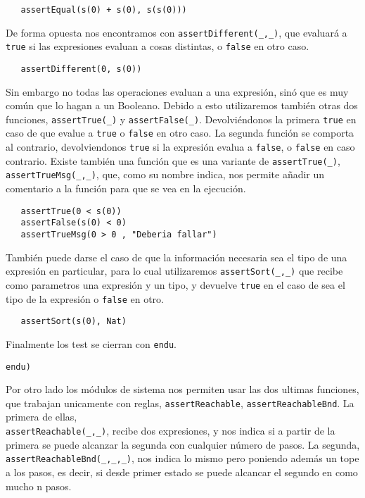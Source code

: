 {\codesize
\begin{verbatim}
   assertEqual(s(0) + s(0), s(s(0)))
\end{verbatim}
}

De forma opuesta nos encontramos con \verb"assertDifferent(_,_)", que evaluará a \texttt{true} si las expresiones evaluan a cosas distintas, o \texttt{false} en otro caso. \par

{\codesize
\begin{verbatim}
   assertDifferent(0, s(0))
\end{verbatim}
}

Sin embargo no todas las operaciones evaluan a una expresión, sinó que es muy común que lo hagan a un Booleano. Debido a esto utilizaremos también otras dos funciones, \verb"assertTrue(_)" y \verb"assertFalse(_)". Devolviéndonos la primera \texttt{true} en caso de que evalue a \texttt{true} o \texttt{false} en otro caso. La segunda función se comporta al contrario, devolviendonos \texttt{true} si la expresión evalua a \texttt{false}, o \texttt{false} en caso contrario. Existe también una función que es una variante de \verb"assertTrue(_)", \verb"assertTrueMsg(_,_)", que, como su nombre indica, nos permite añadir un comentario a la función para que se vea en la ejecución. \par

{\codesize
\begin{verbatim}
   assertTrue(0 < s(0))
   assertFalse(s(0) < 0)
   assertTrueMsg(0 > 0 , "Deberia fallar")
\end{verbatim}
}

También puede darse el caso de que la información necesaria sea el tipo de una expresión en particular, para lo cual utilizaremos \verb"assertSort(_,_)" que recibe como parametros una expresión y un tipo, y devuelve \texttt{true} en el caso de sea el tipo de la expresión o \texttt{false} en otro.\par

{\codesize
\begin{verbatim}
   assertSort(s(0), Nat)
\end{verbatim}
} 

Finalmente los test se cierran con \texttt{endu}. \par

{\codesize
\begin{verbatim}
endu)
\end{verbatim}
}

Por otro lado los módulos de sistema nos permiten usar las dos ultimas funciones, que trabajan unicamente con reglas, \verb"assertReachable", \verb"assertReachableBnd". La primera de ellas,\\ \verb"assertReachable(_,_)", recibe dos expresiones, y nos indica si a partir de la primera se puede alcanzar la segunda con cualquier número de pasos. La segunda, \verb"assertReachableBnd(_,_,_)", nos indica lo mismo pero poniendo además un tope a los pasos, es decir, si desde primer estado se puede alcancar el segundo en como mucho n pasos. \par

